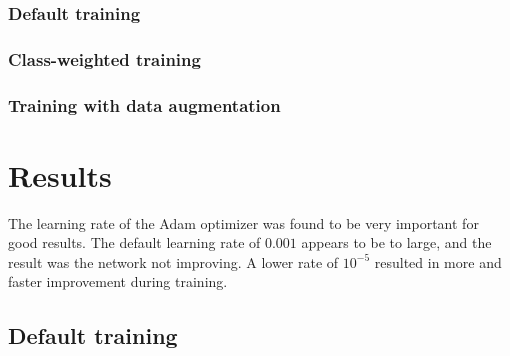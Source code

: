 \documentclass{kththesis}
\begin{document}
\subsection{Default training}


\subsection{Class-weighted training}


\subsection{Training with data augmentation}

\endgroup

\chapter{Results}

The learning rate of the Adam optimizer was found to be very important for good results. The default learning rate of $0.001$ appears to be to large, and the result was the network not improving. A lower rate of $10^{-5}$ resulted in more and faster improvement during training.

\section{Default training}
\end{document}
